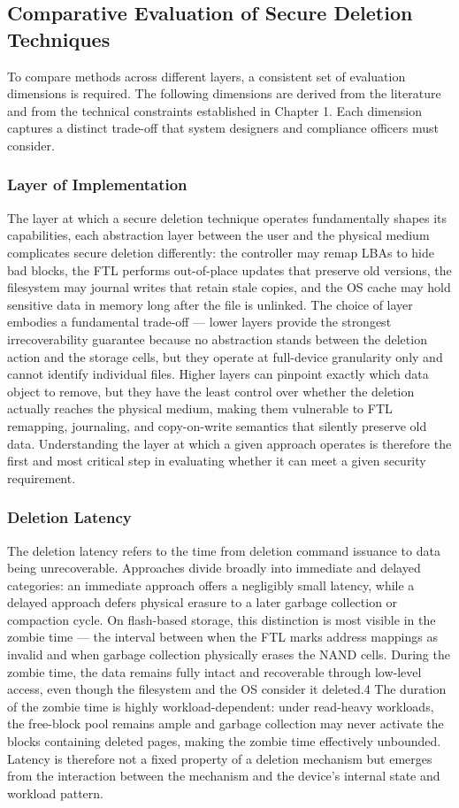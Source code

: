 \subsection{Comparative Evaluation of Secure Deletion Techniques}
To compare methods across different layers, a consistent set of evaluation dimensions is required. The 
following dimensions are derived from the literature and from the technical constraints established in 
Chapter 1. Each dimension captures a distinct trade-off that system designers and compliance officers 
must consider.

\subsubsection{Layer of Implementation}
The layer at which a secure deletion technique operates fundamentally shapes its capabilities, each 
abstraction layer between the user and the physical medium complicates secure deletion differently: 
the controller may remap LBAs to hide bad blocks, the FTL performs out-of-place updates 
that preserve old versions, the filesystem may journal writes that retain stale copies, and the OS 
cache may hold sensitive data in memory long after the file is unlinked. The choice of layer embodies 
a fundamental trade-off — lower layers provide the strongest irrecoverability guarantee because no 
abstraction stands between the deletion action and the storage cells, but they operate at full-device 
granularity only and cannot identify individual files. Higher layers can pinpoint exactly which data 
object to remove, but they have the least control over whether the deletion actually reaches the 
physical medium, making them vulnerable to FTL remapping, journaling, and copy-on-write semantics that 
silently preserve old data. Understanding the layer at which a given approach operates is therefore the 
first and most critical step in evaluating whether it can meet a given security requirement.

\subsubsection{Deletion Latency}
The deletion latency refers to the time from deletion command issuance to data being unrecoverable. 
Approaches divide broadly into immediate and delayed categories: an immediate approach offers a 
negligibly small latency,  while a delayed approach defers physical erasure to a later garbage 
collection or compaction cycle. On flash-based storage, this distinction is most visible in the zombie 
time — the interval between when the FTL marks address mappings as invalid and when garbage collection 
physically erases the NAND cells. During the zombie time, the data remains fully intact and recoverable 
through low-level access, even though the filesystem and the OS consider it deleted.4 The duration of 
the zombie time is highly workload-dependent: under read-heavy workloads, the free-block pool remains 
ample and garbage collection may never activate the blocks containing deleted pages, making the zombie 
time effectively unbounded. Latency is therefore not a fixed property of a deletion mechanism but 
emerges from the interaction between the mechanism and the device's internal state and workload pattern.

